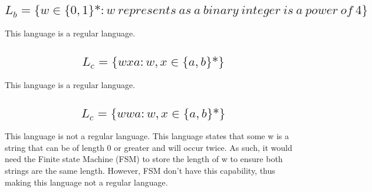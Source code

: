 \documentclass[12pt]{article}
\begin{document}
            \subsection{\[L_b = \{w \in \{0,1\}*:w \ represents \ as \ a \ binary \ integer \ is \ a \ power \ of \ 4\}\]}
                \indent
                This language is a regular language.
                \begin{figure}[ht]
                    \centering
                \end{figure}

                \pagebreak

                \subsection{\[L_c = \{wxa: w,x \in \{a,b\}*\}\]}
                \indent
                This language is a regular language.
                \begin{figure}[ht]
                    \centering
                \end{figure}

                \pagebreak

                \subsection{\[L_c = \{wwa: w,x \in \{a,b\}*\}\]}
                \indent
                This language is not a regular language. This language states that some w is a string that
                can be of length 0 or greater and will occur twice. As such, it would need the Finite state
                Machine (FSM) to store the length of w to ensure both strings are the same length. However,
                FSM don't have this capability, thus making this language not a regular language.
                
\end{document}
